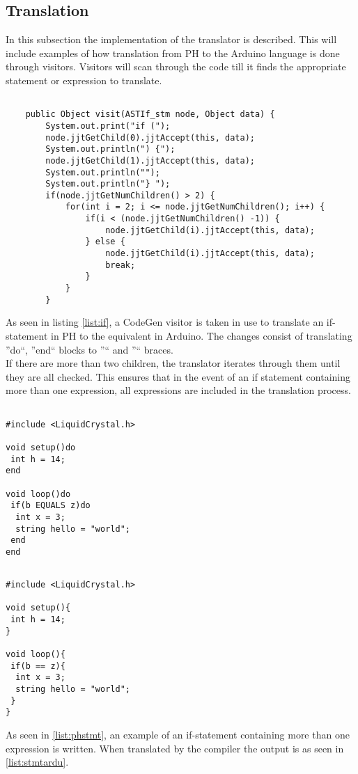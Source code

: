 \subsection{Translation}
In this subsection the implementation of the translator is described. This will include examples of how translation from PH to the Arduino language is done through visitors.
Visitors will scan through the code till it finds the appropriate statement or expression to translate.

\begin{lstlisting}[caption=Visitor for translation of an if-statement, label=list:if]

	public Object visit(ASTIf_stm node, Object data) {
		System.out.print("if (");
		node.jjtGetChild(0).jjtAccept(this, data);
		System.out.println(") {");
		node.jjtGetChild(1).jjtAccept(this, data);
		System.out.println("");
		System.out.println("} ");
		if(node.jjtGetNumChildren() > 2) {
			for(int i = 2; i <= node.jjtGetNumChildren(); i++) {
				if(i < (node.jjtGetNumChildren() -1)) {
					node.jjtGetChild(i).jjtAccept(this, data);
				} else {
					node.jjtGetChild(i).jjtAccept(this, data);
					break;
				}
			}
		}

\end{lstlisting}

As seen in listing \ref{list:if}, a CodeGen visitor is taken in use to translate an if-statement in PH to the equivalent in Arduino. The changes consist of translating ''do``, ''end`` blocks to ''{`` and ''}`` braces. 
\\If there are more than two children, the translator iterates through them until they are all checked. This ensures that in the event of an if statement containing more than one expression, all expressions are included in the translation process.  

\begin{lstlisting}[caption=Example of an if-statement written in PH, label=list:phstmt]

#include <LiquidCrystal.h>

void setup()do
 int h = 14;
end

void loop()do
 if(b EQUALS z)do
  int x = 3;
  string hello = "world";
 end
end
\end{lstlisting}

\begin{lstlisting}[caption=Example of an if-statement in the Arduino language translated by the compiler from PH, label=list:stmtardu]

#include <LiquidCrystal.h>

void setup(){
 int h = 14;
}

void loop(){
 if(b == z){
  int x = 3;
  string hello = "world";
 }
}
\end{lstlisting}

As seen in \ref{list:phstmt}, an example of an if-statement containing more than one expression is written. When translated by the compiler the output is as seen in \ref{list:stmtardu}.




